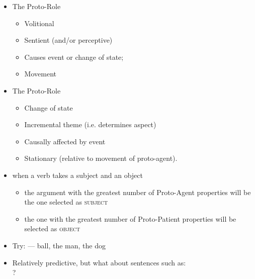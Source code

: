 \documentclass[headrule,footrule]{foils}
\begin{document}
\begin{itemize}
\item  The  Proto-Role 
\begin{itemize}
\item  Volitional
\item  Sentient (and/or perceptive)
\item  Causes event or change of state; 
\item  Movement
\end{itemize}
\item  The  Proto-Role
\begin{itemize}
\item  Change of state
\item  Incremental theme (i.e. determines aspect)
\item  Causally affected by event
\item  Stationary (relative to movement of proto-agent).     
\end{itemize}
\end{itemize}

\begin{itemize}
\item   when a verb takes a subject and an object
  \begin{itemize}
  \item  the argument with the greatest number of Proto-Agent 
    properties will be the one selected as \textsc{subject}
  \item  the one with the greatest number of Proto-Patient properties 
    will be selected as \textsc{object}
  \end{itemize}
\item   Try:  --- ball, the man, the dog

\item   Relatively predictive, but what about sentences 
such as:
\\  ?
\end{itemize}
\end{document}
